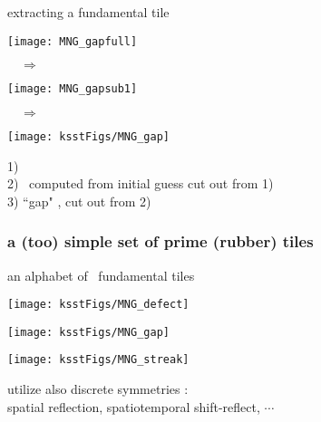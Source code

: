 \begin{frame}{extracting a fundamental tile}
\begin{minipage}[height=.60\textheight]{.24\textheight}
\centering %
\texttt{[image: MNG\_gapfull]}
\end{minipage}
    $\quad\Rightarrow\quad$
\begin{minipage}[height=.60\textheight]{.24\textheight}
\centering %
\texttt{[image: MNG\_gapsub1]}
\end{minipage}
    $\quad\Rightarrow\quad$
\begin{minipage}[height=.60\textheight]{.18\textheight}
\centering             %
\texttt{[image: ksstFigs/MNG\_gap]}
\end{minipage}

1) \twot\ %
    \\
2) \twot\ computed from initial guess cut out from 1)
    \\
3) ``gap" \twot, %
     cut out from 2)
\end{frame}

\begin{frame}%
  \frametitle{a (too) simple set of prime (rubber) tiles}
  \begin{block} {an alphabet of \KS\ fundamental tiles}
\begin{minipage}[height=.60\textheight]{.25\textheight}
\centering             %
\texttt{[image: ksstFigs/MNG\_defect]}
\end{minipage} \qquad
\begin{minipage}[height=.60\textheight]{.25\textheight}
\centering     %
\texttt{[image: ksstFigs/MNG\_gap]}
\end{minipage} \qquad
\begin{minipage}[height=.60\textheight]{.25\textheight}
\centering             %
\texttt{[image: ksstFigs/MNG\_streak]}
\end{minipage}
  \end{block}
\vfill
utilize also discrete symmetries : \\
spatial reflection, spatiotemporal shift-reflect,
$\cdots$
\end{frame}

